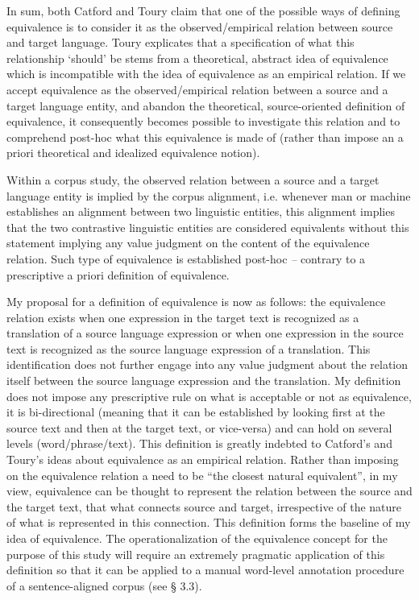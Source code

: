 In sum, both Catford and Toury claim that one of the possible ways of defining equivalence is to consider it as the observed/empirical relation between source and target language. Toury explicates that a specification of what this relationship ‘should’ be stems from a theoretical, abstract idea of equivalence which is incompatible with the idea of equivalence as an empirical relation. If we accept equivalence as the observed/empirical relation between a source and a target language entity, and abandon the theoretical, source-oriented definition of equivalence, it consequently becomes possible to investigate this relation and to comprehend post-hoc what this equivalence is made of (rather than impose an a priori theoretical and idealized equivalence notion).

Within a corpus study, the observed relation between a source and a target language entity is implied by the corpus alignment, i.e. whenever man or machine establishes an alignment between two linguistic entities, this alignment implies that the two contrastive linguistic entities are considered equivalents without this statement implying any value judgment on the content of the equivalence relation. Such type of equivalence is established post-hoc \textit{–} contrary to a prescriptive a priori definition of equivalence.

My proposal for a definition of equivalence is now as follows: the equivalence relation exists when one expression in the target text is recognized as a translation of a source language expression or when one expression in the source text is recognized as the source language expression of a translation. This identification does not further engage into any value judgment about the relation itself between the source language expression and the translation. My definition does not impose any prescriptive rule on what is acceptable or not as equivalence, it is bi-directional (meaning that it can be established by looking first at the source text and then at the target text, or vice-versa) and can hold on several levels (word/phrase/text). This definition is greatly indebted to Catford’s and Toury’s ideas about equivalence as an empirical relation. Rather than imposing on the equivalence relation a need to be “the closest natural equivalent”, in my view, equivalence can be thought to represent the relation between the source and the target text, that what connects source and target, irrespective of the nature of what is represented in this connection. This definition forms the baseline of my idea of equivalence. The operationalization of the equivalence concept for the purpose of this study will require an extremely pragmatic application of this definition so that it can be applied to a manual word-level annotation procedure of a sentence-aligned corpus (see § 3.3).

